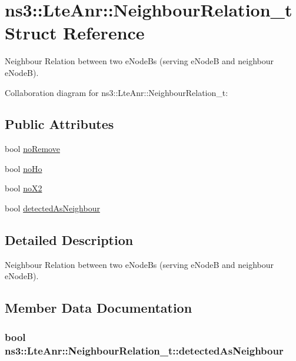\hypertarget{structns3_1_1LteAnr_1_1NeighbourRelation__t}{}\section{ns3\+:\+:Lte\+Anr\+:\+:Neighbour\+Relation\+\_\+t Struct Reference}
\label{structns3_1_1LteAnr_1_1NeighbourRelation__t}


Neighbour Relation between two e\+Node\+Bs (serving e\+NodeB and neighbour e\+NodeB).  




Collaboration diagram for ns3\+:\+:Lte\+Anr\+:\+:Neighbour\+Relation\+\_\+t\+:
\subsection*{Public Attributes}
\begin{DoxyCompactItemize}
\item 
bool \hyperlink{structns3_1_1LteAnr_1_1NeighbourRelation__t_ad83a00dc9c81d875b32839fd06df8b65}{no\+Remove}
\item 
bool \hyperlink{structns3_1_1LteAnr_1_1NeighbourRelation__t_a358a8de6a7af0d2cd1b7f3098a847b06}{no\+Ho}
\item 
bool \hyperlink{structns3_1_1LteAnr_1_1NeighbourRelation__t_ada3a5ebbe0afc8b6a30bcdc1bc11ca84}{no\+X2}
\item 
bool \hyperlink{structns3_1_1LteAnr_1_1NeighbourRelation__t_a1017394082954f607f8fade2c078df43}{detected\+As\+Neighbour}
\end{DoxyCompactItemize}


\subsection{Detailed Description}
Neighbour Relation between two e\+Node\+Bs (serving e\+NodeB and neighbour e\+NodeB). 

\subsection{Member Data Documentation}
\subsubsection[{\texorpdfstring{detected\+As\+Neighbour}{detectedAsNeighbour}}]{\setlength{\rightskip}{0pt plus 5cm}bool ns3\+::\+Lte\+Anr\+::\+Neighbour\+Relation\+\_\+t\+::detected\+As\+Neighbour}\hypertarget{structns3_1_1LteAnr_1_1NeighbourRelation__t_a1017394082954f607f8fade2c078df43}{}\label{structns3_1_1LteAnr_1_1NeighbourRelation__t_a1017394082954f607f8fade2c078df43}
